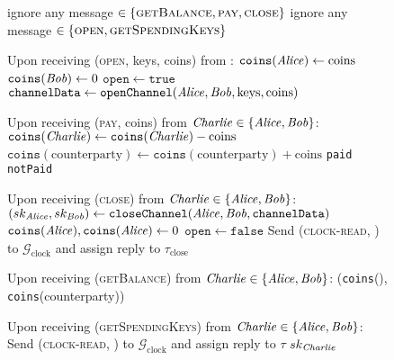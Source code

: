\begin{figure}[H]
  \begin{systembox}{\chanfunc}
    \begin{algorithmic}[1]
        \State ignore any message $\in \{\textsc{getBalance}, \textsc{pay},
        \textsc{close}\}$
      \Else
        \State ignore any message $\in \{\textsc{open},
        \textsc{getSpendingKeys}\}$
      \EndIf
      \Statex

      \State Upon receiving (\textsc{open}, keys, coins) from \alice:
      \Indent
        \State $\mathtt{coins}(\mathit{Alice}) \gets \mathrm{coins}$
        \State $\mathtt{coins}(\mathit{Bob}) \gets 0$
        \State $\mathtt{open} \gets \mathtt{true}$
        \State $\mathtt{channelData} \gets \mathtt{openChannel}(\mathit{Alice}, \mathit{Bob},
        \mathrm{keys}, \mathrm{coins})$ 
      \EndIndent
      \Statex

      \State Upon receiving (\textsc{pay}, coins) from $\mathit{Charlie} \in \{\mathit{Alice},
      \mathit{Bob}\}$:
      \Indent
          \State $\mathtt{coins}(\mathit{Charlie}) \gets \mathtt{coins}(\mathit{Charlie}) -
          \mathrm{coins}$
          \State $\mathtt{coins}(\mathrm{counterparty}) \gets
          \mathtt{coins}(\mathrm{counterparty}) + \mathrm{coins}$
          \State \Return \texttt{paid}
        \Else
          \State \Return \texttt{notPaid}
        \EndIf
      \EndIndent
      \Statex

      \State Upon receiving (\textsc{close}) from $\mathit{Charlie} \in \{\mathit{Alice},
      \mathit{Bob}\}$:
      \Indent
        \State $(sk_{\mathit{Alice}}, sk_{\mathit{Bob}}) \gets \mathtt{closeChannel}(\mathit{Alice},
        \mathit{Bob}, \mathtt{channelData})$ 
        \State $\mathtt{coins}(\mathit{Alice}), \mathtt{coins}(\mathit{Alice}) \gets 0$
        \State $\mathtt{open} \gets \mathtt{false}$
        \State Send (\textsc{clock-read}, \fch) to
        $\mathcal{G}_{\mathrm{clock}}$ and assign reply to
        $\tau_{\mathrm{close}}$
      \EndIndent
      \Statex

      \State Upon receiving (\textsc{getBalance}) from $\mathit{Charlie} \in \{\mathit{Alice},
      \mathit{Bob}\}$:
      \Indent
        \State \Return (\texttt{coins}(\charlie), \texttt{coins}(counterparty))
      \EndIndent
      \Statex

      \State Upon receiving (\textsc{getSpendingKeys}) from $\mathit{Charlie} \in \{\mathit{Alice},
      \mathit{Bob}\}$:
      \Indent
        \State Send (\textsc{clock-read}, \fch) to
        $\mathcal{G}_{\mathrm{clock}}$ and assign reply to $\tau$
          \State \Return $sk_{\mathit{Charlie}}$
        \EndIf
      \EndIndent
    \end{algorithmic}
  \end{systembox}
  \caption{}
  \label{alg:chanfunc}
\end{figure}
